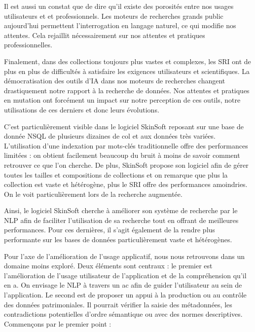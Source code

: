 Il est aussi un constat que de dire qu'il existe des porosités entre nos usages utilisateurs et et professionnels. Les moteurs de recherches grands public aujourd'hui permettent l'interrogation en langage naturel, ce qui modifie nos attentes. Cela rejaillit nécessairement sur nos attentes et pratiques professionnelles.\newline
	
Finalement, dans des collections toujours plus vastes et complexes, les \gls{SRI} ont de plus en plus de difficultés à satisfaire les exigences utilisateurs et scientifiques. La démocratisation des outils d'\gls{IA} dans nos moteurs de recherches changent drastiquement notre rapport à la recherche de données. Nos attentes et pratiques en mutation ont forcément un impact sur notre perception de ces outils, notre utilisations de ces derniers et donc leurs évolutions. 
	
C'est particulièrement visible dans le logiciel SkinSoft reposant sur une base de donnée \gls{NSQL} de plusieurs dizaines de \gls{col} et aux données très variées. L'utilisation d'une indexation par mots-clés traditionnelle offre des performances limitées : on obtient facilement beaucoup du bruit à moins de savoir comment retrouver ce que l'on cherche. De plus, SkinSoft propose son logiciel afin de gérer toutes les tailles et compositions de collections et on remarque que plus la collection est vaste et hétérogène, plus le \gls{SRI} offre des performances amoindries. On le voit particulièrement lors de la recherche augmentée. 
	
Ainsi, le logiciel SkinSoft cherche à améliorer son système de recherche par le \gls{NLP} afin de faciliter l'utilisation de sa recherche tout en offrant de meilleures performances. Pour ces dernières, il s'agit également de la rendre plus performante sur les bases de données particulièrement vaste et hétérogènes.\newline
	
Pour l'axe de l'amélioration de l'usage applicatif, nous nous retrouvons dans un domaine moins exploré. Deux éléments sont centraux : le premier est l'amélioration de l'usage utilisateur de l'application et de la compréhension qu'il en a. On envisage le \gls{NLP} à travers un \gls{ac} afin de guider l'utilisateur au sein de l'application. Le second est de proposer un appui à la production ou au contrôle des données patrimoniales. Il pourrait vérifier la saisie des métadonnées, les contradictions potentielles d'ordre sémantique ou avec des normes descriptives. Commençons par le premier point : 
	

